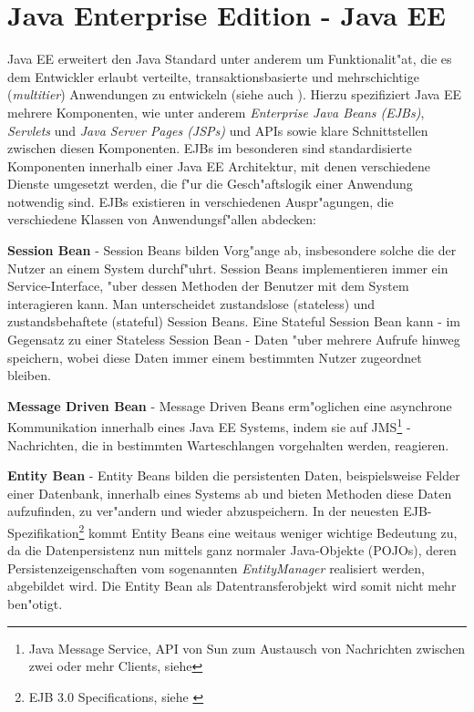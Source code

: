 \section{Java Enterprise Edition - Java EE}
\label{sec:background:jboss}
\label{sec:background:rmi}
Java EE erweitert den Java Standard unter anderem um Funktionalit"at, die es dem Entwickler erlaubt verteilte, transaktionsbasierte und
mehrschichtige (\emph{multitier}) Anwendungen zu entwickeln (siehe auch \cite{JEEHP}). Hierzu spezifiziert Java EE mehrere Komponenten, wie unter anderem
\emph{Enterprise Java Beans (EJBs)}, \emph{Servlets} und \emph{Java Server Pages (JSPs)} und APIs sowie klare Schnittstellen zwischen
diesen Komponenten. EJBs im besonderen sind standardisierte Komponenten innerhalb einer Java EE Architektur, mit denen verschiedene
Dienste umgesetzt werden, die f"ur die Gesch"aftslogik einer Anwendung notwendig sind. EJBs existieren in verschiedenen Auspr"agungen, die
verschiedene Klassen von Anwendungsf"allen abdecken:
\begin{description}
\item{\textbf{Session Bean}} - Session Beans bilden Vorg"ange ab, insbesondere solche die der Nutzer an einem System durchf"uhrt. Session Beans
    implementieren immer ein Service-Interface, "uber dessen Methoden der Benutzer mit dem System interagieren kann. 
    Man unterscheidet zustandslose (stateless) und zustandsbehaftete (stateful) Session Beans. Eine Stateful Session Bean kann -
    im Gegensatz zu einer Stateless Session Bean - Daten "uber mehrere Aufrufe hinweg speichern, wobei diese Daten immer
    einem bestimmten Nutzer zugeordnet bleiben.
\item{\textbf{Message Driven Bean}} - Message Driven Beans erm"oglichen eine asynchrone Kommunikation innerhalb eines Java EE Systems, indem
    sie auf JMS\footnote{Java Message Service, API von Sun zum Austausch von Nachrichten zwischen zwei oder mehr Clients, siehe\cite{JMSHP}}
    -Nachrichten, die in bestimmten Warteschlangen vorgehalten werden, reagieren.
\item{\textbf{Entity Bean}} - Entity Beans bilden die persistenten Daten, beispielsweise Felder einer Datenbank, innerhalb eines Systems ab und
    bieten Methoden diese Daten aufzufinden, zu ver"andern und wieder abzuspeichern. In der neuesten EJB-Spezifikation\footnote{
    EJB 3.0 Specifications, siehe \cite{EJBHP}} kommt Entity Beans eine weitaus weniger wichtige Bedeutung zu, da die Datenpersistenz nun
    mittels ganz normaler Java-Objekte (POJOs), deren Persistenzeigenschaften vom sogenannten \emph{EntityManager} realisiert werden, abgebildet wird.
    Die Entity Bean als Datentransferobjekt wird somit nicht mehr ben"otigt.
\end{description}
